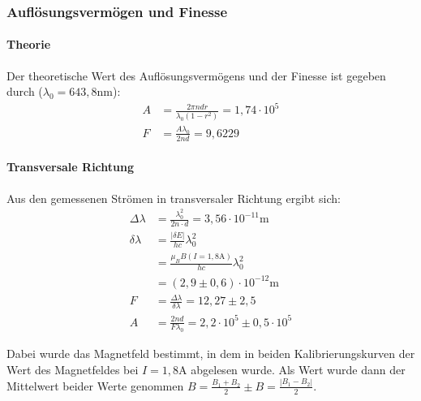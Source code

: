\subsubsection{Auflösungsvermögen und Finesse}
\paragraph{Theorie}
Der theoretische Wert des Auflösungsvermögens und der Finesse ist gegeben durch ($\lambda_0 =643,8 \si{\nano\meter}$):
\begin{align*}
A &= \frac{2\pi n d r}{\lambda_0 (1-r^2)} = 1,74\cdot 10^5\\
F &= \frac{A \lambda_0}{2 n d} = 9,6229 
\end{align*}

\paragraph{Transversale Richtung}
Aus den gemessenen Strömen in transversaler Richtung ergibt sich:
\begin{align*}
\Delta \lambda &= \frac{\lambda_0^2}{2n\cdot d} = 3,56 \cdot 10^{-11} \si{\meter}\\
\delta \lambda &= \frac{|\delta E|}{hc}\lambda_0^2\\
	&= \frac{\mu_B B(I = 1,8\si{\ampere})}{hc}\lambda_0^2\\
	&= (2,9\pm 0,6) \cdot 10^{-12} \si{\meter}\\
F &= \frac{\Delta \lambda}{\delta\lambda} = 12,27 \pm 2,5\\
A&= \frac{2 n d}{F \lambda_0} = 2,2\cdot 10^5 \pm 0,5 \cdot 10^5
\end{align*}

Dabei wurde das Magnetfeld bestimmt, in dem in beiden Kalibrierungskurven der Wert des Magnetfeldes bei $I = 1,8 \si{\ampere}$ abgelesen wurde. Als Wert wurde dann der Mittelwert beider Werte genommen $B = \frac{B_1+B_2}{2} \pm B = \frac{|B_1-B_2|}{2}$.\\


